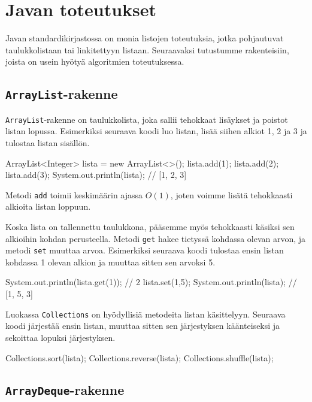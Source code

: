 \section{Javan toteutukset}

Javan standardikirjastossa on monia listojen toteutuksia,
jotka pohjautuvat taulukkolistaan tai linkitettyyn listaan.
Seuraavaksi tutustumme rakenteisiin, joista on usein
hyötyä algoritmien toteutuksessa.

\subsection{\texttt{ArrayList}-rakenne}

\texttt{ArrayList}-rakenne on taulukkolista,
joka sallii tehokkaat lisäykset ja poistot listan lopussa.
Esimerkiksi seuraava koodi luo listan, lisää siihen alkiot
1, 2 ja 3 ja tulostaa listan sisällön.

\begin{code}
ArrayList<Integer> lista = new ArrayList<>();
lista.add(1);
lista.add(2);
lista.add(3);
System.out.println(lista); // [1, 2, 3]
\end{code}

Metodi \texttt{add} toimii keskimäärin ajassa $O(1)$,
joten voimme lisätä tehokkaasti alkioita listan loppuun.

Koska lista on tallennettu taulukkona,
pääsemme myös tehokkaasti käsiksi sen alkioihin
kohdan perusteella.
Metodi \texttt{get} hakee tietyssä kohdassa olevan arvon,
ja metodi \texttt{set} muuttaa arvoa.
Esimerkiksi seuraava koodi tulostaa ensin
listan kohdassa 1 olevan alkion ja muuttaa sitten
sen arvoksi 5.

\begin{code}
System.out.println(lista.get(1)); // 2
lista.set(1,5);
System.out.println(lista); // [1, 5, 3]
\end{code}

Luokassa \texttt{Collections} on hyödyllisiä metodeita
listan käsittelyyn.
Seuraava koodi järjestää ensin listan,
muuttaa sitten sen järjestyksen käänteiseksi
ja sekoittaa lopuksi järjestyksen.

\begin{code}
Collections.sort(lista);
Collections.reverse(lista);
Collections.shuffle(lista);
\end{code}

\subsection{\texttt{ArrayDeque}-rakenne}


